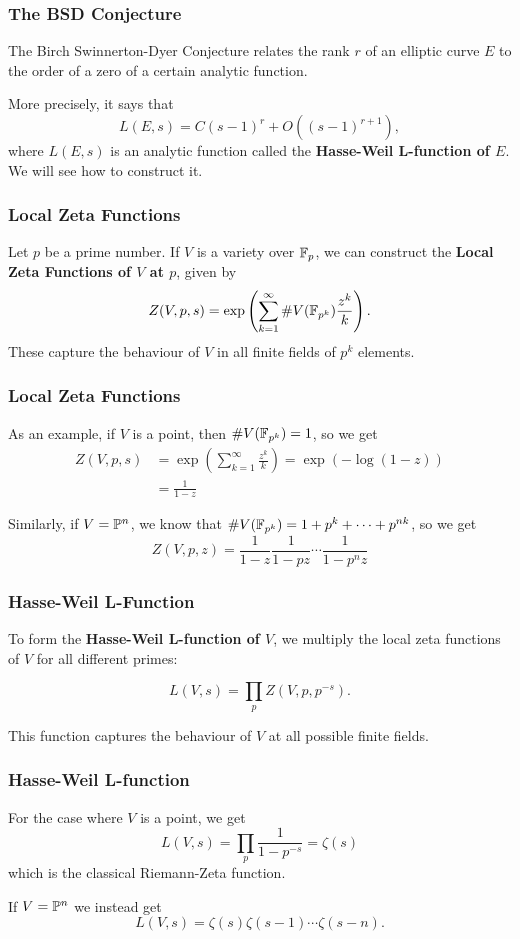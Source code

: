 \message{ !name(presentation.tex)}\documentclass{beamer}
\begin{document}
\begin{frame}
  \frametitle{The BSD Conjecture}
  The Birch Swinnerton-Dyer Conjecture relates the rank $r$ of an elliptic
  curve $E$ to the order of a zero of a certain analytic function. \pause

  More precisely, it says that
  \[L(E,s) = C (s-1)^r + O((s-1)^{r+1}),\]
  where $L(E,s)$ is an analytic function called the \textbf{Hasse-Weil
    L-function of $E$}. We will see how to construct it.
\end{frame}
 
\begin{frame}
  \frametitle{Local Zeta Functions}
  Let $p$ be a prime number.
  If $V$ is a variety over $\mathbb{F}_p$, we can construct the \textbf{Local Zeta
    Functions of $V$ at $p$}, given by
  \[Z(V,p,s) = \exp \left( \sum\limits_{k=1}^\infty \# V(\mathbb{F}_{p^k})
      \frac{z^k}{k} \right).\] \pause
  These capture the behaviour of $V$ in all finite fields of $p^k$ elements.
\end{frame}

\begin{frame}
  \frametitle{Local Zeta Functions}
  As an example, if $V$ is a point, then $\# V(\mathbb{F}_{p^k}) = 1$, so we get
  \begin{equation*}
    \begin{split}
      Z(V,p,s) &= \exp \left( \sum\limits_{k=1}^\infty \frac{z^k}{k} \right)
      = \exp \left( -\log (1-z) \right) \\
      &= \frac{1}{1-z}
    \end{split}
  \end{equation*} \pause

  Similarly, if $V = {\mathbb P}^n$, we know that $\# V(\mathbb{F}_{p^k}) = 1 + p^k + \cdots +
  p^{nk}$, so we get 
  \[Z(V,p,z) = \frac{1}{1-z} \frac{1}{1-pz}\cdots \frac{1}{1-p^nz}\]
\end{frame} 

\begin{frame}
  \frametitle{Hasse-Weil L-Function}
  To form the \textbf{Hasse-Weil L-function of $V$},
  we multiply the local zeta functions
  of $V$ for all different primes:

  \[L(V,s) = \prod\limits_p Z(V,p,p^{-s}).\] \pause

  This function captures the behaviour of $V$ at all possible finite fields.

\end{frame}

\begin{frame}
  \frametitle{Hasse-Weil L-function}
  For the case where $V$ is a point, we get
  \[L(V,s) = \prod \limits_p \frac{1}{1-p^{-s}} = \zeta(s)\]
  which is the classical Riemann-Zeta function. \pause 

  If $V = {\mathbb P}^n$ we instead get
  \[L(V,s) = \zeta(s) \zeta(s-1) \cdots \zeta (s-n).\]
\end{frame}
\end{document}

